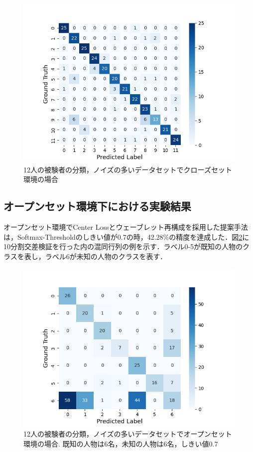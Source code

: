 \begin{figure}[H]
\begin{center}
\includegraphics[width=\linewidth]{./fig/noisy_dataset/cross_val_Fold0_close_level6.png}
\end{center}
\caption{12人の被験者の分類，ノイズの多いデータセットでクローズセット環境の場合}
\label{fig:12close-conf}
\end{figure}

\subsection{オープンセット環境下における実験結果}
オープンセット環境でCenter Lossとウェーブレット再構成を採用した提案手法は，Softmax-Thresholdのしきい値が0.7の時，42.28\%の精度を達成した．図\ref{fig:12open-conf}に10分割交差検証を行った内の混同行列の例を示す．ラベル0-5が既知の人物のクラスを表し，ラベル6が未知の人物のクラスを表す．

\begin{figure}[H]
  \begin{center}
  \includegraphics[width=\linewidth]{./fig/noisy_dataset/cross_val_Fold0_threshold0.7_6_6.png}
  \end{center}
\caption{12人の被験者の分類，ノイズの多いデータセットでオープンセット環境の場合.
既知の人物は6名，未知の人物は6名，しきい値0.7}
\label{fig:12open-conf}
\end{figure}

